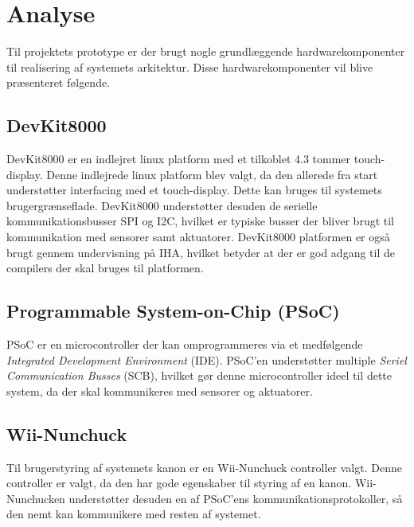 \chapter{Analyse}
\label{afsnit:analyse}
Til projektets prototype er der brugt nogle grundlæggende hardwarekomponenter til realisering af systemets arkitektur. Disse hardwarekomponenter vil blive præsenteret følgende.

\section{DevKit8000}
DevKit8000 er en indlejret linux platform med et tilkoblet 4.3 tommer touch-display. Denne indlejrede linux platform blev valgt, da den allerede fra start understøtter interfacing med et touch-display. Dette kan bruges til systemets brugergrænseflade. DevKit8000 understøtter desuden de serielle kommunikationsbusser SPI og I2C, hvilket er typiske busser der bliver brugt til kommunikation med sensorer samt aktuatorer. \newline 
\noindent DevKit8000 platformen er også brugt gennem undervisning på IHA, hvilket betyder at der er god adgang til de compilers der skal bruges til platformen.

\section{Programmable System-on-Chip (PSoC)}
PSoC er en microcontroller der kan omprogrammeres via et medfølgende \textit{Integrated Development Environment} (IDE). PSoC'en understøtter multiple \textit{Seriel Communication Busses} (SCB), hvilket gør denne microcontroller ideel til dette system, da der skal kommunikeres med sensorer og aktuatorer.

\section{Wii-Nunchuck}
Til brugerstyring af systemets kanon er en Wii-Nunchuck controller valgt. Denne controller er valgt, da den har gode egenskaber til styring af en kanon. Wii-Nunchucken understøtter desuden en af PSoC'ens kommunikationsprotokoller, så den nemt kan kommunikere med resten af systemet.
